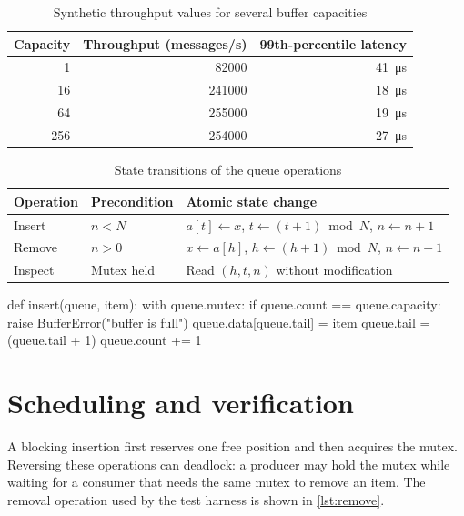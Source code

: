 \documentclass[english]{../../unipd-notes}
\begin{document}
\begin{table}[H]
  \centering
  \caption{Synthetic throughput values for several buffer capacities}\label{tab:throughput}
  \begin{tabular}{rrr}
    \toprule
    Capacity & Throughput (messages/s) & 99th-percentile latency \\
    \midrule
    1 & 82000 & \qty{41}{\micro\second} \\
    16 & 241000 & \qty{18}{\micro\second} \\
    64 & 255000 & \qty{19}{\micro\second} \\
    256 & 254000 & \qty{27}{\micro\second} \\
    \bottomrule
  \end{tabular}
\end{table}

\begin{table}[H]
  \centering
  \caption{State transitions of the queue operations}\label{tab:transitions}
  \begin{tabularx}{\textwidth}{lLL}
    \toprule
    Operation & Precondition & Atomic state change \\
    \midrule
    Insert & $n<N$ & $a[t]\gets x$, $t\gets(t+1)\bmod N$, $n\gets n+1$ \\
    Remove & $n>0$ & $x\gets a[h]$, $h\gets(h+1)\bmod N$, $n\gets n-1$ \\
    Inspect & Mutex held & Read $(h,t,n)$ without modification \\
    \bottomrule
  \end{tabularx}
\end{table}

\begin{unipdcode}[language=Python,caption={A checked insertion operation},label={lst:insert}]
def insert(queue, item):
    with queue.mutex:
        if queue.count == queue.capacity:
            raise BufferError("buffer is full")
        queue.data[queue.tail] = item
        queue.tail = (queue.tail + 1) %
        queue.count += 1
\end{unipdcode}

\chapter{Scheduling and verification}

A blocking insertion first reserves one free position and then acquires the mutex. Reversing these operations can deadlock: a producer may hold the mutex while waiting for a consumer that needs the same mutex to remove an item. The removal operation used by the test harness is shown in \cref{lst:remove}.
\end{document}
